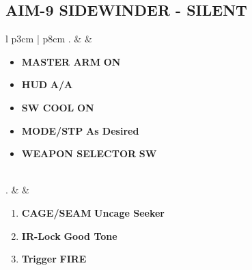 \documentclass[8pt,usenames,dvipsnames,twoside]{article}
\begin{document}
		\subsection{AIM-9 SIDEWINDER - SILENT}
		\begin{center}
			\begin{tabular}{l p{3cm} | p{8cm}}
				. &  & 
				\begin{minipage}[t]{\linewidth}
					\vspace{-7pt}
					\begin{itemize}
						\item \textbf{MASTER ARM} \dotfill \textbf{ON}
						\item \textbf{HUD} \dotfill \textbf{A/A}
						\item \textbf{SW COOL} \dotfill \textbf{ON}
						\item \textbf{MODE/STP} \dotfill \textbf{As Desired}
						\item \textbf{WEAPON SELECTOR} \dotfill \textbf{SW}
					\end{itemize} 
				\end{minipage} \\
				. &  & 
				\begin{minipage}[t]{\linewidth}
					\vspace{-7pt}
					\begin{enumerate}[label=(\alph*)]
						\item \textbf{CAGE/SEAM} \dotfill \textbf{Uncage Seeker}
						\item \textbf{IR-Lock} \dotfill \textbf{Good Tone}
						\item \textbf{Trigger} \dotfill \textbf{FIRE}
					\end{enumerate}
				\end{minipage} \\
				\bottomrule
			\end{tabular}
		\end{center}
		
\end{document}
